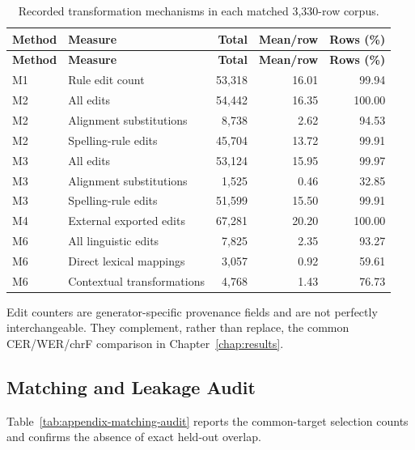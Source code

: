 \documentclass[12pt, a4paper, twoside, openany]{report}
\begin{document}
\begin{longtable}{p{1.6cm}p{4.4cm}rrr}
	\caption{Recorded transformation mechanisms in each matched 3,330-row corpus.}\label{tab:appendix-method-edits}\\
	\toprule
	\textbf{Method} & \textbf{Measure} & \textbf{Total} & \textbf{Mean/row} & \textbf{Rows (\%)} \\
	\midrule
	\endfirsthead
	\toprule
	\textbf{Method} & \textbf{Measure} & \textbf{Total} & \textbf{Mean/row} & \textbf{Rows (\%)} \\
	\midrule
	\endhead
	M1 & Rule edit count & 53,318 & 16.01 & 99.94 \\
	M2 & All edits & 54,442 & 16.35 & 100.00 \\
	M2 & Alignment substitutions & 8,738 & 2.62 & 94.53 \\
	M2 & Spelling-rule edits & 45,704 & 13.72 & 99.91 \\
	M3 & All edits & 53,124 & 15.95 & 99.97 \\
	M3 & Alignment substitutions & 1,525 & 0.46 & 32.85 \\
	M3 & Spelling-rule edits & 51,599 & 15.50 & 99.91 \\
	M4 & External exported edits & 67,281 & 20.20 & 100.00 \\
	M6 & All linguistic edits & 7,825 & 2.35 & 93.27 \\
	M6 & Direct lexical mappings & 3,057 & 0.92 & 59.61 \\
	M6 & Contextual transformations & 4,768 & 1.43 & 76.73 \\
	\bottomrule
\end{longtable}

Edit counters are generator-specific provenance fields and are not perfectly interchangeable. They complement, rather than replace, the common CER/WER/chrF comparison in Chapter~\ref{chap:results}.

\subsection{Matching and Leakage Audit}

Table~\ref{tab:appendix-matching-audit} reports the common-target selection counts and confirms the absence of exact held-out overlap.
\end{document}

